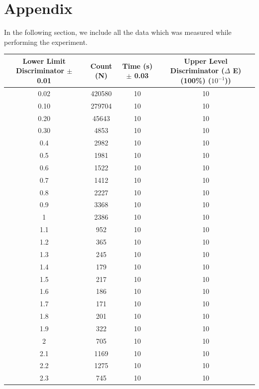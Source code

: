 \documentclass[a4paper]{report}
\numberwithin{equation}{section}
\begin{document}
\printbibliography

\chapter{Appendix} \label{sec:Appendix}

In the following section, we include all the data which was measured while performing the experiment.

\begin{table}[!ht]
    \centering
	\begin{tabular}{|c|c|c|c|}
    \hline
	Lower Limit Discriminator $\pm$ 0.01 & Count (N) & Time (s) $\pm$ 0.03 & Upper Level Discriminator ($\Delta$ E) (100\%) ($10^{-1}$)) \\ \hline
        0.02 & 420580 & 10 & 10 \\ \hline
        0.10 & 279704 & 10 & 10 \\ \hline
        0.20 & 45643 & 10 & 10 \\ \hline
        0.30 & 4853 & 10 & 10 \\ \hline
        0.4 & 2982 & 10 & 10 \\ \hline
        0.5 & 1981 & 10 & 10 \\ \hline
        0.6 & 1522 & 10 & 10 \\ \hline
        0.7 & 1412 & 10 & 10 \\ \hline
        0.8 & 2227 & 10 & 10 \\ \hline
        0.9 & 3368 & 10 & 10 \\ \hline
        1 & 2386 & 10 & 10 \\ \hline
        1.1 & 952 & 10 & 10 \\ \hline
        1.2 & 365 & 10 & 10 \\ \hline
        1.3 & 245 & 10 & 10 \\ \hline
        1.4 & 179 & 10 & 10 \\ \hline
        1.5 & 217 & 10 & 10 \\ \hline
        1.6 & 186 & 10 & 10 \\ \hline
        1.7 & 171 & 10 & 10 \\ \hline
        1.8 & 201 & 10 & 10 \\ \hline
        1.9 & 322 & 10 & 10 \\ \hline
        2 & 705 & 10 & 10 \\ \hline
        2.1 & 1169 & 10 & 10 \\ \hline
        2.2 & 1275 & 10 & 10 \\ \hline
        2.3 & 745 & 10 & 10 \\ \hline

\end{tabular}
\end{table}
\end{document}
